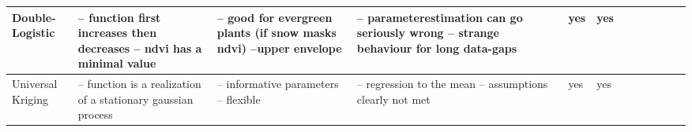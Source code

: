 \begin{table}[!ht]
\begin{tabular}{p{1.6cm}p{3.3cm}p{3.3cm}p{3.3cm}p{0.4cm}p{0.4cm}p{3cm}p{3cm}p{3cm}p{3cm}p{3cm}p{3cm}|}
    Double-Logistic &
	-- function first increases then decreases -- ndvi has a minimal value &
	-- good for evergreen plants (if snow masks ndvi) --upper envelope  &
	-- parameterestimation can go seriously wrong -- strange behaviour for long data-gaps &
	yes &
	yes \\ \hline%
    
    Universal Kriging &
	-- function is a realization of a stationary gaussian process &
	-- informative parameters -- flexible &
	-- regression to the mean -- assumptions clearly not met &
	yes &
	yes \\ \hline%


    \hline
    \end{tabular}
    \normalsize
\end{table}
